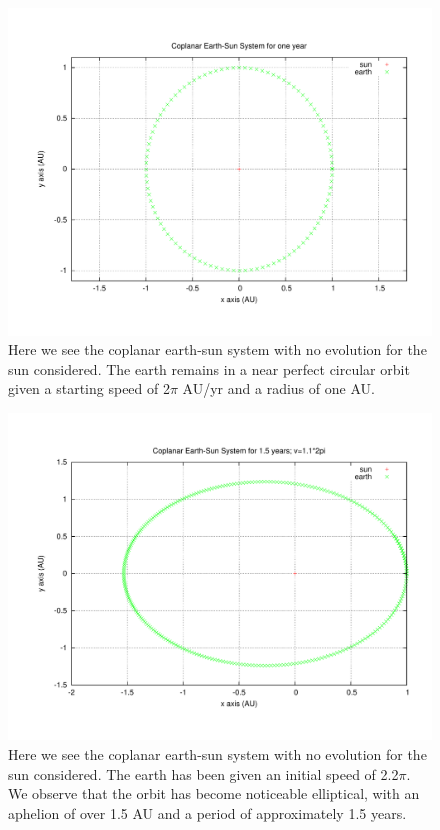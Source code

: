\documentclass[11pt,a4paper]{article}
\begin{document}
\begin{figure}
\centering
\includegraphics[width=1.0\textwidth]{coplanar_earthsun.pdf}
\caption{Here we see the coplanar earth-sun system with no evolution for the sun considered. The earth remains in a near perfect circular orbit given a starting speed of 2$\pi$ AU/yr and a radius of one AU.}
\end{figure}
\begin{figure}
\centering
\includegraphics[width=1.0\textwidth]{coplanar_earthsun_v11.pdf}
\caption{Here we see the coplanar earth-sun system with no evolution for the sun considered. The earth has been given an initial speed of 2.2$\pi$. We observe that the orbit has become noticeable elliptical, with an aphelion of over 1.5 AU and a period of approximately 1.5 years.}
\end{figure}
\end{document}
